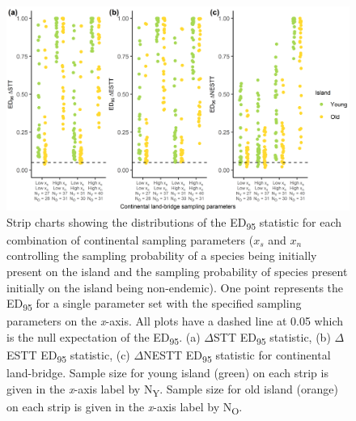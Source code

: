 \begin{figure}
    \centering
    \includegraphics{continental_land_bridge_sample_facet.png}
    \caption{Strip charts showing the distributions of the ED\textsubscript{95} statistic for each combination of continental sampling parameters ($x_s$ and $x_n$ controlling the sampling probability of a species being initially present on the island and the sampling probability of species present initially on the island being non-endemic). One point represents the ED\textsubscript{95} for a single parameter set with the specified sampling parameters on the \textit{x}-axis. All plots have a dashed line at 0.05 which is the null expectation of the ED\textsubscript{95}. (a) $\Delta$STT ED\textsubscript{95} statistic, (b) $\Delta$ESTT ED\textsubscript{95} statistic, (c) $\Delta$NESTT ED\textsubscript{95} statistic for continental land-bridge. Sample size for young island (green) on each strip is given in the \textit{x}-axis label by N\textsubscript{Y}. Sample size for old island (orange) on each strip is given in the \textit{x}-axis label by N\textsubscript{O}.}
    \label{fig:continental_land_bridge_sample_facet}
\end{figure}

